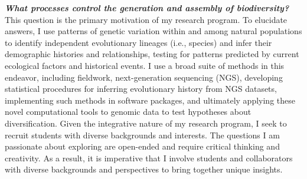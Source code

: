 \textbf{\textit{What processes control the generation and assembly of
        biodiversity?}}
This question is the primary motivation of my research program.
To elucidate answers, I use patterns of genetic variation within and among
natural populations to identify independent evolutionary lineages (i.e.,
species) and infer their demographic histories and relationships, testing for
patterns predicted by current ecological factors and historical events.
I use a broad suite of methods in this endeavor, including
fieldwork,
next-generation sequencing (NGS),
developing statistical procedures for inferring evolutionary
history from NGS datasets,
implementing such methods in software packages,
and ultimately applying these novel computational tools to genomic data to test
hypotheses about diversification.
Given the integrative nature of my research program, I seek to recruit students
with diverse backgrounds and interests.
The questions I am passionate about exploring are open-ended and require
critical thinking and creativity.
As a result, it is imperative that I involve students and collaborators with
diverse backgrounds and perspectives to bring together unique insights.

